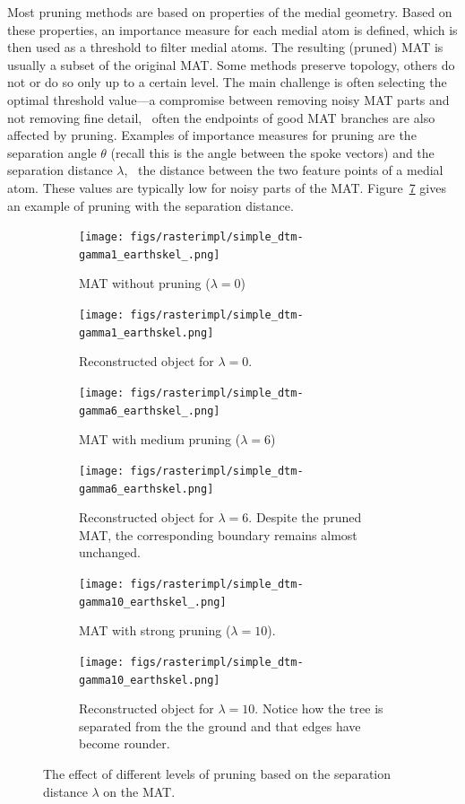Most pruning methods are based on properties of the medial geometry. 
Based on these properties, an importance measure for each medial atom is defined, which is then used as a threshold to filter medial atoms. 
The resulting (pruned) MAT is usually a subset of the original MAT. 
Some methods preserve topology, others do not or do so only up to a certain level. 
The main challenge is often selecting the optimal threshold value---a compromise between removing noisy MAT parts and not removing fine detail, \ie\ often the endpoints of good MAT branches are also affected by pruning.
Examples of importance measures for pruning are the separation angle $\theta$ (recall this is the angle between the spoke vectors) and the separation distance $\lambda$, \ie\ the distance between the two feature points of a medial atom. 
These values are typically low for noisy parts of the MAT.
Figure~\ref{fig:imaimp} gives an example of pruning with the separation distance.
\begin{figure}
	\centering
	\begin{subfigure}{0.4\linewidth}
		\texttt{[image: figs/rasterimpl/simple\_dtm-gamma1\_earthskel\_.png]}
		\caption{MAT without pruning ($\lambda=0$)}
		\label{fig:imaimp:a}
	\end{subfigure}
	\quad
	\begin{subfigure}{0.4\linewidth}
		\texttt{[image: figs/rasterimpl/simple\_dtm-gamma1\_earthskel.png]}
		\caption{Reconstructed object for $\lambda=0$.}
		\label{fig:imaimp:b}
	\end{subfigure}
	
	\begin{subfigure}{0.4\linewidth}
		\texttt{[image: figs/rasterimpl/simple\_dtm-gamma6\_earthskel\_.png]}
		\caption{MAT with medium pruning ($\lambda=6$)}
		\label{fig:imaimp:c}
	\end{subfigure}
	\quad
	\begin{subfigure}{0.4\linewidth}
		\texttt{[image: figs/rasterimpl/simple\_dtm-gamma6\_earthskel.png]}
		\caption{Reconstructed object for $\lambda=6$. Despite the pruned MAT, the corresponding boundary remains almost unchanged.}
		\label{fig:imaimp:d}
	\end{subfigure}
	
	\begin{subfigure}{0.4\linewidth}
		\texttt{[image: figs/rasterimpl/simple\_dtm-gamma10\_earthskel\_.png]}
		\caption{MAT with strong pruning ($\lambda=10$).}
		\label{fig:imaimp:e}
	\end{subfigure}
	\quad
	\begin{subfigure}{0.4\linewidth}
		\texttt{[image: figs/rasterimpl/simple\_dtm-gamma10\_earthskel.png]}
		\caption{Reconstructed object for $\lambda=10$. Notice how the tree is separated from the the ground and that edges have become rounder.}
		\label{fig:imaimp:f}
	\end{subfigure}
	\caption{The effect of different levels of pruning based on the separation distance $\lambda$ on the MAT.}
	\label{fig:imaimp}
\end{figure}


